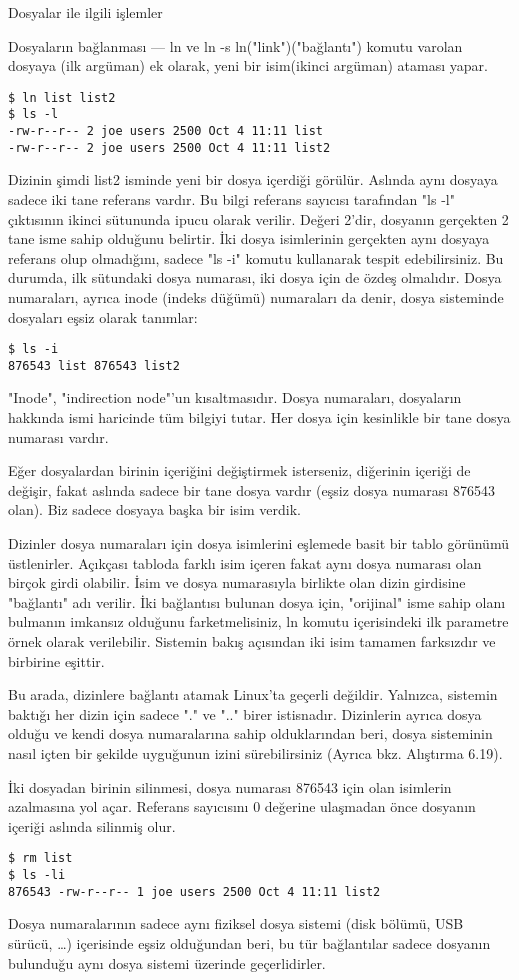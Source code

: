 \begin{section}{Dosyalar ile ilgili işlemler}
\begin{subsection}{Dosyaların bağlanması — ln ve ln -s}
ln("link")("bağlantı") komutu varolan dosyaya (ilk argüman) ek olarak, yeni bir isim(ikinci argüman) ataması yapar.
\begin{verbatim}
$ ln list list2
$ ls -l
-rw-r--r-- 2 joe users 2500 Oct 4 11:11 list
-rw-r--r-- 2 joe users 2500 Oct 4 11:11 list2
\end{verbatim}
Dizinin şimdi list2 isminde yeni bir dosya içerdiği görülür. Aslında aynı dosyaya sadece iki tane referans vardır. Bu bilgi referans sayıcısı tarafından "ls -l" çıktısının ikinci sütununda ipucu olarak verilir. Değeri 2'dir, dosyanın gerçekten 2 tane isme sahip olduğunu belirtir. İki dosya isimlerinin gerçekten aynı dosyaya referans olup olmadığını, sadece "ls -i" komutu kullanarak tespit edebilirsiniz. Bu durumda, ilk sütundaki dosya numarası, iki dosya için de özdeş olmalıdır. Dosya numaraları, ayrıca inode (indeks düğümü) numaraları da denir, dosya sisteminde dosyaları eşsiz olarak tanımlar:
\begin{verbatim}
$ ls -i
876543 list 876543 list2
\end{verbatim}
"Inode", "indirection node"'un kısaltmasıdır. Dosya numaraları, dosyaların hakkında ismi haricinde tüm bilgiyi tutar. Her dosya için kesinlikle bir tane dosya numarası vardır.

Eğer dosyalardan birinin içeriğini değiştirmek isterseniz, diğerinin içeriği de değişir, fakat aslında sadece bir tane dosya vardır (eşsiz dosya numarası 876543 olan). Biz sadece dosyaya başka bir isim verdik.

Dizinler dosya numaraları için dosya isimlerini eşlemede basit bir tablo görünümü üstlenirler. Açıkçası tabloda farklı isim içeren fakat aynı dosya numarası olan birçok girdi olabilir. İsim ve dosya numarasıyla birlikte olan dizin girdisine "bağlantı" adı verilir. İki bağlantısı bulunan dosya için, "orijinal" isme sahip olanı bulmanın imkansız olduğunu farketmelisiniz, ln komutu içerisindeki ilk parametre örnek olarak verilebilir. Sistemin bakış açısından iki isim tamamen farksızdır ve birbirine eşittir.

Bu arada, dizinlere bağlantı atamak Linux'ta geçerli değildir. Yalnızca, sistemin baktığı her dizin için  sadece "." ve ".." birer istisnadır. Dizinlerin ayrıca dosya olduğu ve kendi dosya numaralarına sahip olduklarından beri, dosya sisteminin nasıl içten bir şekilde uyguğunun izini sürebilirsiniz (Ayrıca bkz. Alıştırma 6.19).

İki dosyadan birinin silinmesi, dosya numarası 876543 için olan isimlerin azalmasına yol açar. Referans sayıcısını 0 değerine ulaşmadan önce dosyanın içeriği aslında silinmiş olur.
\begin{verbatim}
$ rm list
$ ls -li
876543 -rw-r--r-- 1 joe users 2500 Oct 4 11:11 list2
\end{verbatim}
Dosya numaralarının sadece aynı fiziksel dosya sistemi (disk bölümü, USB sürücü, \ldots) içerisinde eşsiz olduğundan beri, bu tür bağlantılar sadece dosyanın bulunduğu aynı dosya sistemi üzerinde geçerlidirler.


\end{subsection}
\end{section}
